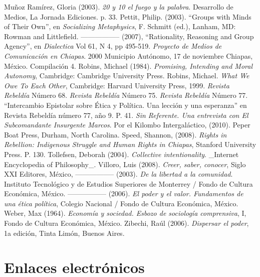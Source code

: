 \documentclass[oneside]{book}
\begin{document}
\begin{thebibliography}{99}
 Muñoz Ramírez, Gloria (2003). \textit{20 y 10 el fuego y la palabra}. Desarrollo de Medios, La Jornada Ediciones. p. 33.
 Pettit, Philip. (2003). “Groups with Minds of Their Own”, en \textit{Socializing Metaphysics}, F. Schmitt (ed.), Lanham, MD: Rowman and Littlefield.
 ----------------- (2007), “Rationality, Reasoning and Group Agency”,  en \textit{Dialectica} Vol 61, N 4, pp 495-519.
 \textit{Proyecto de Medios de Comunicación en Chiapas}. 2000 Municipio Autónomo, 17 de noviembre Chiapas, México. Compilación 4.
 Robins, Michael (1984). \textit{Promising, Intending and Moral Autonomy}, Cambridge: Cambridge University Press. 
 Robins, Michael. \textit{What We Owe To Each Other}, Cambridge: Harvard University Press, 1999.
 \textit{Revista Rebeldía} Número 68.
 \textit{Revista Rebeldía} Número 75.
 \textit{Revista Rebeldía} Número 77. “Intercambio Epistolar sobre Ética y Política. Una lección y una esperanza” en Revista Rebeldía número 77, año 9. P. 41.
 \textit{Sin Referente. Una entrevista con El Subcomandante Insurgente Marcos}. Por el Kilombo Intergaláctico, (2010).  Peper Boat Press, Durham, North Carolina.
 Speed, Shannon, (2008). \textit{Rights in Rebellion: Indigenous Struggle and Human Rights in Chiapas}, Stanford University Press. P. 130.
 Tollefsen, Deborah (2004). \textit{Collective intentionality}. \_Internet Encyclopedia of Philosophy\_.
 Villoro, Luis (2008). \textit{Creer, saber, conocer}, Siglo XXI Editores, México, 
 ----------------- (2003). \textit{De la libertad a la comunidad}. Instituto Tecnológico y de Estudios Superiores de Monterrey / Fondo de Cultura Económica, México.
 ----------------- (2006). \textit{El poder y el valor. Fundamentos de una ética política}, Colegio Nacional / Fondo de Cultura Económica, México.
 Weber, Max (1964). \textit{Economía y sociedad. Esbozo de sociología comprensiva}, I, Fondo de Cultura Económica, México.
 Zibechi, Raúl (2006). \textit{Dispersar el poder}, 1a edición, Tinta Limón, Buenos Aires.

\end{thebibliography}

\chapter*{Enlaces electrónicos}
\end{document}
